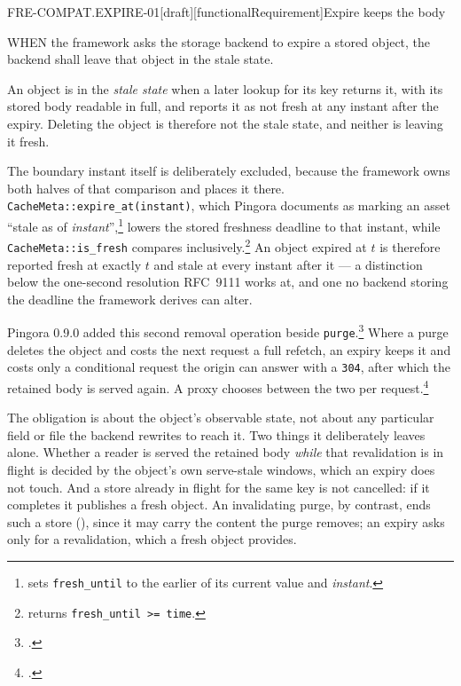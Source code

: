 \begin{requirement}{FRE-COMPAT.EXPIRE-01}[draft][functionalRequirement]{Expire keeps the body}


  WHEN the framework asks the storage backend to expire a stored object, the
  backend shall leave that object in the stale state.

  An object is in the \emph{stale state} when a later lookup for its key
  returns it, with its stored body readable in full, and reports it as not
  fresh at any instant after the expiry. Deleting the object is
  therefore not the stale state, and neither is leaving it fresh.

  The boundary instant itself is deliberately excluded, because the framework
  owns both halves of that comparison and places it there.
  \texttt{CacheMeta::expire\_at(instant)}, which Pingora documents as marking
  an asset ``stale as of
  \emph{instant}'',\footnote{
  sets \texttt{fresh\_until} to the earlier of its current value and
  \emph{instant}.} lowers the stored freshness deadline to that instant, while
  \texttt{CacheMeta::is\_fresh} compares
  inclusively.\footnote{
  returns \texttt{fresh\_until >= time}.} An object expired at $t$ is therefore
  reported fresh at exactly $t$ and stale at every instant after it --- a
  distinction below the one-second resolution RFC~9111 works at, and one no
  backend storing the deadline the framework derives can alter.

  Pingora 0.9.0 added this second removal operation beside
  \texttt{purge}.\footnote{.}
  Where a purge deletes the object and costs the next request a full refetch,
  an expiry keeps it and costs only a conditional request the origin can answer
  with a \texttt{304}, after which the retained body is served again. A proxy
  chooses between the two per request.\footnote{.}

  The obligation is about the object's observable state, not about any
  particular field or file the backend rewrites to reach it. Two things it
  deliberately leaves alone. Whether a reader is served the retained body \emph{while} that
  revalidation is in flight is decided by the object's own serve-stale windows,
  which an expiry does not touch. And a store already in flight for the same key
  is not cancelled: if it completes it publishes a fresh object. An
  invalidating purge, by contrast, ends such a store
  (), since it may carry the content the
  purge removes; an expiry asks only for a revalidation, which a fresh
  object provides.


\end{requirement}
